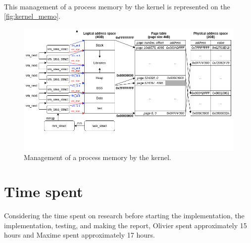 \documentclass[a4paper, 11pt, oneside]{article}
\begin{document}
\paragraph{}This management of a process memory by the kernel is represented on the \autoref{fig:kernel_memo}.
\begin{figure}[H]
  \centering
  \includegraphics[scale=0.6]{kernel_memo.png}
  \caption{Management of a process memory by the kernel.}\label{fig:kernel_memo}
\end{figure}

\section{Time spent}
\paragraph{}Considering the time spent on research before starting the implementation, the implementation, testing, and making the report, Olivier spent approximately 15 hours and Maxime spent approximately 17 hours.
\end{document}
